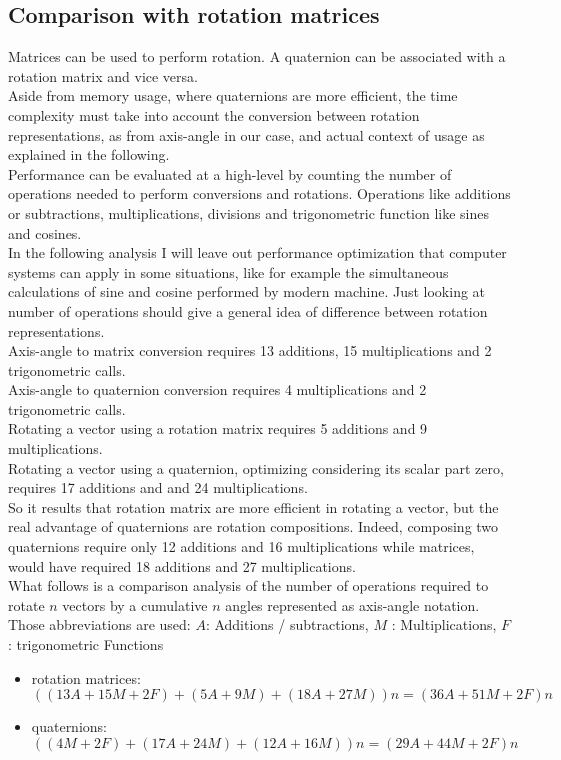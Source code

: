 \subsection{Comparison with rotation matrices}
Matrices can be used to perform rotation. \cite{Eberly2016RotationRA} 
A quaternion can be associated with a rotation matrix and vice versa. \cite{amslaurea6701} \\
Aside from memory usage, where quaternions are more efficient, the time complexity must take into account the conversion between rotation representations, as from axis-angle in our case, and actual context of usage as explained in the following.  \\
Performance can be evaluated at a high-level by counting the number of operations needed to perform conversions and rotations. Operations like additions or subtractions, multiplications, divisions and trigonometric function like sines and cosines. \\
In the following analysis I will leave out performance optimization that computer systems can apply in some situations, like for example the simultaneous calculations of sine and cosine performed by modern machine. Just looking at number of operations should give a general idea of difference between rotation representations. \\
Axis-angle to matrix conversion requires 13 additions, 15 multiplications and 2 trigonometric calls. \\
Axis-angle to quaternion conversion requires 4 multiplications and 2 trigonometric calls. \\
Rotating a vector using a rotation matrix requires 5 additions and 9 multiplications. \\
Rotating a vector using a quaternion, optimizing considering its scalar part zero, requires 17 additions and and 24 multiplications. \\
So it results that rotation matrix are more efficient in rotating a vector, but the real advantage of quaternions are rotation compositions. 
Indeed, composing two quaternions require only 12 additions and 16 multiplications while matrices, would have required 18 additions and 27 multiplications. \\
What follows is a comparison analysis of the number of operations required to rotate $n$ vectors by a cumulative $n$ angles represented as axis-angle notation.
Those abbreviations are used: $A$: Additions / subtractions, $M$ : Multiplications, $F$: trigonometric Functions
\begin{itemize}
\item rotation matrices: ${((13A + 15M + 2F) + (5A + 9M) + (18A + 27M))n} = {(36A + 51M + 2F)n}$
\item quaternions: ${((4M + 2F) + (17A + 24M) + (12A + 16M))n} = {(29A + 44M + 2F)n}$
\end{itemize}

